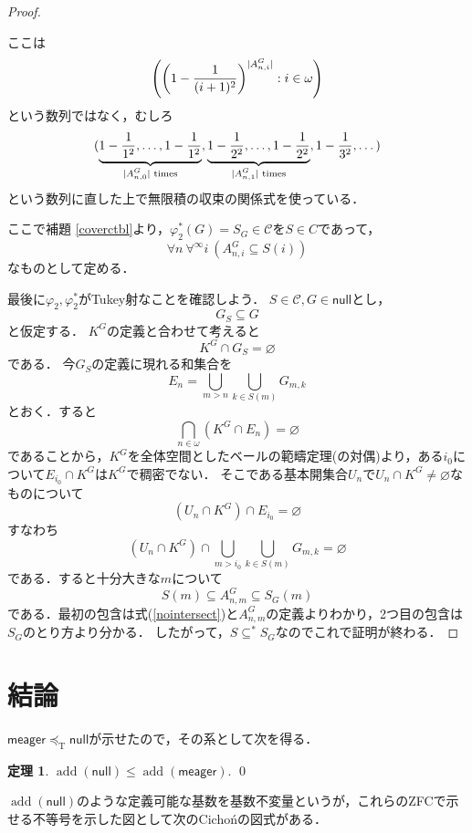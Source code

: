 \documentclass[uplatex,dvipdfmx]{jsarticle}
\newcommand{\scrC}{\mathcal{C}}
\newcommand{\tukeyle}{\preceq_\mathrm{T}}
\newcommand{\add}{\operatorname{add}}
\newcommand{\nul}{\mathsf{null}}
\newcommand{\meager}{\mathsf{meager}}
\DeclarePairedDelimiter\abs{\lvert}{\rvert}
\renewcommand\emptyset{\varnothing}
\renewcommand\subset{\subseteq}
\theoremstyle{definition}
\newtheorem{thm}{定理}
\theoremstyle{named}
\newenvironment{reason}
{
	\begin{mdframed}[backgroundcolor=reasonbg,linewidth=0]
		\color{reasontext}
		\small
	}
	{
	\end{mdframed}
}
\begin{document}
\begin{proof}
		\begin{reason}
			ここは
			\[
			\left(\left(1 - \frac{1}{(i+1)^2}\right)^{\abs{A^G_{n, i}}} : i \in \omega\right)
			\]
			という数列ではなく，むしろ
			\[
			(\underbrace{1-\frac{1}{1^2}, \dots, 1-\frac{1}{1^2}}_\text{$\abs{A^G_{n, 0}}$ times}, \underbrace{1-\frac{1}{2^2}, \dots, 1-\frac{1}{2^2}}_\text{$\abs{A^G_{n, 1}}$ times}, 1-\frac{1}{3^2}, \dots)
			\]
			という数列に直した上で無限積の収束の関係式を使っている．
		\end{reason}
		
		ここで補題 \ref{coverctbl}より，$\varphi_2^*(G) = S_G \in \scrC$を$S \in C$であって，
		\[
			\forall n\ \forall^\infty i\ (A^G_{n, i} \subset S(i))
		\]
		なものとして定める．
		
		最後に$\varphi_2, \varphi_2^\ast$がTukey射なことを確認しよう．
		$S \in \scrC, G \in \nul$とし，
		\[
		G_S \subset G
		\]
		と仮定する．
		$K^G$の定義と合わせて考えると
		\[
		K^G \cap G_S = \emptyset
		\]
		である．
		今$G_S$の定義に現れる和集合を
		\[
			E_n = \bigcup_{m > n} \bigcup_{k \in S(m)} G_{m, k}
		\]
		とおく．すると
		\[
		\bigcap_{n \in \omega} (K^G \cap E_n) = \emptyset
		\]
		であることから，$K^G$を全体空間としたベールの範疇定理(の対偶)より，ある$i_0$について$E_{i_0} \cap K^G$は$K^G$で稠密でない．
		そこである基本開集合$U_n$で$U_n \cap K^G \ne \emptyset$なものについて
		\[
			(U_n \cap K^G) \cap E_{i_0} = \emptyset
		\]
		すなわち
		\begin{equation}
		(U_n \cap K^G) \cap  \bigcup_{m > i_0} \bigcup_{k \in S(m)} G_{m, k} = \emptyset \label{nointersect}
		\end{equation}
		である．すると十分大きな$m$について
		\[
			S(m) \subset A^G_{n, m} \subset S_G(m)
		\]
		である．最初の包含は式(\ref{nointersect})と$A^G_{n, m}$の定義よりわかり，2つ目の包含は$S_G$のとり方より分かる．
		したがって，$S \subset^* S_G$なのでこれで証明が終わる．
	\end{proof}
	
	\section{結論}
	
	$\meager \tukeyle \nul$が示せたので，その系として次を得る．
	
	\begin{thm}
		$\add(\nul) \le \add(\meager)$. \qed
	\end{thm}

	$\add(\nul)$のような定義可能な基数を基数不変量というが，これらのZFCで示せる不等号を示した図として次のCichońの図式がある．
\end{document}

